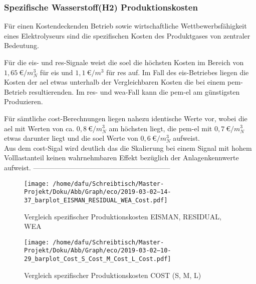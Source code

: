\documentclass[onecolumn,10pt,titlepage]{article}
\begin{document}
\subsubsection{Spezifische Wasserstoff(H2) Produktionskosten} %
Für einen Kostendeckenden Betrieb sowie wirtschaftliche Wettbewerbsfähigkeit eines Elektrolyseurs sind die spezifischen Kosten des Produktgases von zentraler Bedeutung.

Für die \gls{eis}- und \gls{res}-Signale weist die \gls{soel} die höchsten Kosten im Bereich von $1,65~\euro{}/m^3_N$ für \gls{eis} und $1,1~\euro{}/m^3$ für \gls{res} auf.
Im Fall des \gls{eis}-Betriebes liegen die Kosten der \gls{ael} etwas unterhalb der Vergleichbaren Kosten die bei einem \gls{pem}-Betrieb resultierenden. Im \gls{res}- und \gls{wea}-Fall kann die \gls{pem}-\gls{el} am günstigsten Produzieren. %

Für sämtliche \gls{cost}-Berechnungen liegen nahezu identische Werte vor, wobei die \gls{ael} mit Werten von ca. $0,8~\euro{}/m^3_N$ am höchsten liegt, die  \gls{pem}-\gls{el} mit $0,7~\euro{}/m^3_N$ etwas darunter liegt und  die \gls{soel} Werte von $0,6~\euro{}/m^3_N$ aufweist.\\
Aus dem \gls{cost}-Sigal wird deutlich das die Skalierung bei einem Signal mit hohem Volllastanteil keinen wahrnehmbaren Effekt bezüglich der Anlagenkennwerte aufweist.
%
-----------------------------------------------------------
\begin{figure}[!tbp]
	\centering
	\begin{minipage}[b]{0.49\textwidth}
	\texttt{[image: /home/dafu/Schreibtisch/Master-Projekt/Doku/Abb/Graph/eco/2019-03-02--14-37\_barplot\_EISMAN\_RESIDUAL\_WEA\_Cost.pdf]}
\caption[Vergleich spezifischer Produktionskosten EIS,RES, WEA]{Vergleich spezifischer Produktionskosten EISMAN, RESIDUAL, WEA}
\label{fig:analy_nC_speCo}
	\end{minipage}
	\hfill
	\begin{minipage}[b]{0.49\textwidth}
	\texttt{[image: /home/dafu/Schreibtisch/Master-Projekt/Doku/Abb/Graph/eco/2019-03-02--10-29\_barplot\_Cost\_S\_Cost\_M\_Cost\_L\_Cost.pdf]}
\caption[Vergleich spezifischer Produktionskosten COST]{Vergleich spezifischer Produktionskosten COST (S, M, L)}
\label{fig:analy_COST_speCo}
	\end{minipage}
\end{figure}
\end{document}
